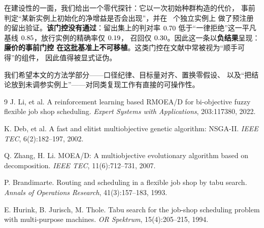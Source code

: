 \documentclass[UTF8, a4paper, 11pt]{ctexart}
\begin{document}
在建设性的一面，我们给出一个零代探针：它以一次初始种群构造的代价，
事前判定“某新实例上初始化的净增益是否会出现”，并在 \HKn\ 个独立实例上
做了预注册的留出验证。\textbf{该门控没有通过}：留出集上的判对率 $0.70$
低于“一律拒绝”这一平凡基线 $0.85$，放行实例的精确率仅 $0.19$，
召回仅 $0.30$。因此这一条以\textbf{负结果}呈现：\textbf{廉价的事前门控
在这批基准上不可移植}。这类门控在文献中常被视为“顺手可得”的组件，
因此值得被显式证伪。

我们希望本文的方法学部分——口径纪律、目标量对齐、置换零假设、
以及“把结论放到未调参实例上”——对同类复现工作有直接的可操作性。

\clearpage

\begin{thebibliography}{9}
\label{sec:refs}
J. Li, et al.
\newblock A reinforcement learning based RMOEA/D for bi-objective fuzzy flexible
job shop scheduling.
\newblock \emph{Expert Systems with Applications}, 203:117380, 2022.

K. Deb, et al.
\newblock A fast and elitist multiobjective genetic algorithm: NSGA-II.
\newblock \emph{IEEE TEC}, 6(2):182--197, 2002.

Q. Zhang, H. Li.
\newblock MOEA/D: A multiobjective evolutionary algorithm based on decomposition.
\newblock \emph{IEEE TEC}, 11(6):712--731, 2007.

P. Brandimarte.
\newblock Routing and scheduling in a flexible job shop by tabu search.
\newblock \emph{Annals of Operations Research}, 41(3):157--183, 1993.

E. Hurink, B. Jurisch, M. Thole.
\newblock Tabu search for the job-shop scheduling problem with multi-purpose machines.
\newblock \emph{OR Spektrum}, 15(4):205--215, 1994.
\end{thebibliography}
\end{document}
